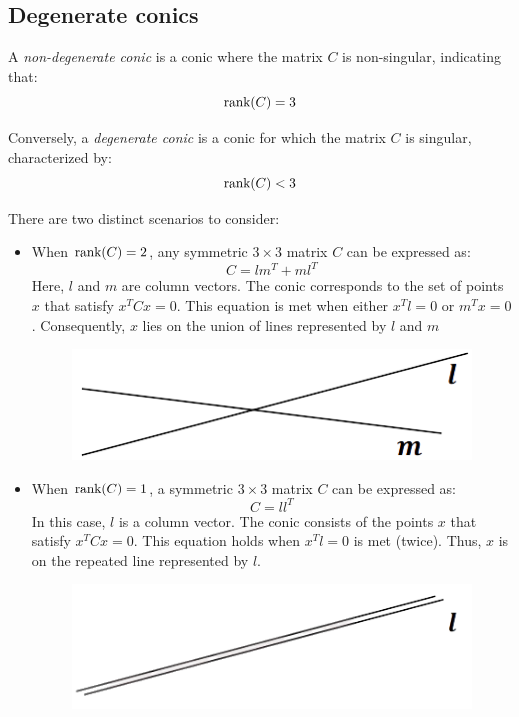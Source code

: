 \subsection*{Degenerate conics}
\begin{definition}
    A \emph{non-degenerate conic} is a conic where the matrix $C$ is non-singular, indicating that: 
    \[\textnormal{rank}(C)=3\]

    Conversely, a \emph{degenerate conic} is a conic  for which the matrix $C$ is singular, characterized by: 
    \[\textnormal{rank}(C) < 3\]
\end{definition}
There are two distinct scenarios to consider:
\begin{itemize}
    \item When $\textnormal{rank}(C) = 2$, any symmetric $3 \times 3$ matrix $C$ can be expressed as:
        \[C=lm^T+ml^T\]
        Here, $l$ and $m$ are column vectors. 
        The conic corresponds to the set of points $x$  that satisfy $x^TCx=0$.
        This equation is met when either $x^Tl=0$ or $m^Tx=0$. 
        Consequently, $x$ lies on the union of lines represented by $l$ and $m$
        \begin{figure}[H]
            \centering
            \includegraphics[width=0.25\linewidth]{images/inters.png}
        \end{figure}
    \item When $\textnormal{rank}(C) = 1$, a symmetric $3 \times 3$ matrix $C$ can be expressed as:
        \[C=ll^T\]
        In this case, $l$ is a column vector. 
        The conic consists of the points $x$ that satisfy $x^TCx=0$.
        This equation holds  when $x^Tl=0$ is met (twice). 
        Thus, $x$ is on the repeated line represented by $l$.
        \begin{figure}[H]
            \centering
            \includegraphics[width=0.25\linewidth]{images/rep.png}
        \end{figure}
\end{itemize}